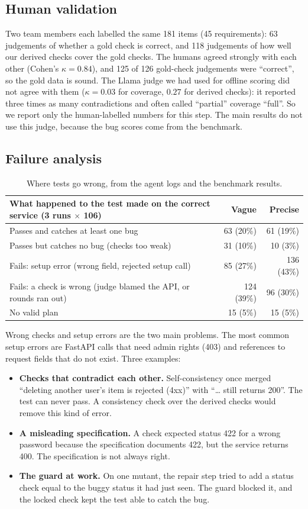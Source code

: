 \documentclass[11pt,a4paper]{article}
\begin{document}
\subsection{Human validation}
Two team members each labelled the same 181 items (45 requirements): 63 judgements of whether a gold check is correct, and 118 judgements of how well our derived checks cover the gold checks. The humans agreed strongly with each other (Cohen's $\kappa=0.84$), and 125 of 126 gold-check judgements were ``correct'', so the gold data is sound. The Llama judge we had used for offline scoring did not agree with them ($\kappa=0.03$ for coverage, $0.27$ for derived checks): it reported three times as many contradictions and often called ``partial'' coverage ``full''. So we report only the human-labelled numbers for this step. The main results do not use this judge, because the bug scores come from the benchmark.

\subsection{Failure analysis}
\begin{table}[H]\centering\small
\begin{tabular}{lrr}\toprule
What happened to the test made on the correct service (3 runs $\times$ 106) & Vague & Precise\\\midrule
Passes and catches at least one bug & 63 (20\%) & 61 (19\%)\\
Passes but catches no bug (checks too weak) & 31 (10\%) & 10 (3\%)\\
Fails: setup error (wrong field, rejected setup call) & 85 (27\%) & 136 (43\%)\\
Fails: a check is wrong (judge blamed the API, or rounds ran out) & 124 (39\%) & 96 (30\%)\\
No valid plan & 15 (5\%) & 15 (5\%)\\
\bottomrule\end{tabular}
\caption{Where tests go wrong, from the agent logs and the benchmark results.}
\end{table}
Wrong checks and setup errors are the two main problems. The most common setup errors are FastAPI calls that need admin rights (403) and references to request fields that do not exist. Three examples:
\begin{itemize}
\item \textbf{Checks that contradict each other.} Self-consistency once merged ``deleting another user's item is rejected (4xx)'' with ``\ldots{} still returns 200''. The test can never pass. A consistency check over the derived checks would remove this kind of error.
\item \textbf{A misleading specification.} A check expected status 422 for a wrong password because the specification documents 422, but the service returns 400. The specification is not always right.
\item \textbf{The guard at work.} On one mutant, the repair step tried to add a status check equal to the buggy status it had just seen. The guard blocked it, and the locked check kept the test able to catch the bug.
\end{itemize}
\end{document}
